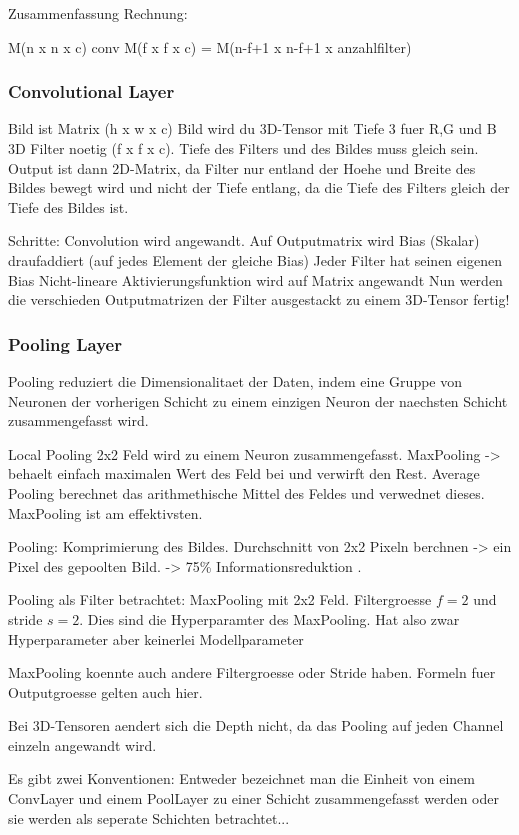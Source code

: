 \documentclass[../main]{subfiles}
\begin{document}
Zusammenfassung Rechnung:

M(n x n x c) conv M(f x f x c) = M(n-f+1 x n-f+1 x anzahlfilter)

\subsubsection{Convolutional Layer}
Bild ist Matrix (h x w x c)
Bild wird du 3D-Tensor mit Tiefe 3 fuer R,G und B
3D Filter noetig (f x f x c). Tiefe des Filters und des Bildes muss gleich sein.
Output ist dann 2D-Matrix, da Filter nur entland der Hoehe und Breite des Bildes
bewegt wird und nicht der Tiefe entlang, da die Tiefe des Filters gleich der
Tiefe des Bildes ist.

Schritte:
Convolution wird angewandt.
Auf Outputmatrix wird Bias (Skalar) draufaddiert (auf jedes Element der gleiche Bias)
Jeder Filter hat seinen eigenen Bias
Nicht-lineare Aktivierungsfunktion wird auf Matrix angewandt
Nun werden die verschieden Outputmatrizen der Filter ausgestackt zu einem
3D-Tensor
fertig!
\subsubsection{Pooling Layer}
Pooling reduziert die Dimensionalitaet der Daten, indem eine Gruppe von Neuronen
der vorherigen Schicht zu einem einzigen Neuron der naechsten Schicht
zusammengefasst wird.

Local Pooling 2x2 Feld wird zu einem Neuron zusammengefasst. MaxPooling ->
behaelt einfach maximalen Wert des Feld bei und verwirft den Rest. Average
Pooling berechnet das arithmethische Mittel des Feldes und verwednet dieses.
MaxPooling ist am effektivsten.

Pooling:
Komprimierung des Bildes. Durchschnitt von 2x2 Pixeln berchnen -> ein Pixel des
gepoolten Bild. -> 75\% Informationsreduktion .

Pooling als Filter betrachtet:
MaxPooling mit 2x2 Feld. Filtergroesse $f=2$ und stride $s=2$. Dies sind die
Hyperparamter des MaxPooling. Hat also zwar Hyperparameter aber keinerlei Modellparameter

MaxPooling koennte auch andere Filtergroesse oder Stride haben. Formeln fuer
Outputgroesse gelten auch hier.

Bei 3D-Tensoren aendert sich die Depth nicht, da das Pooling auf jeden Channel
einzeln angewandt wird.


Es gibt zwei Konventionen:
Entweder bezeichnet man die Einheit von einem ConvLayer und einem PoolLayer zu
einer Schicht zusammengefasst werden oder sie werden als seperate Schichten betrachtet...
\end{document}
